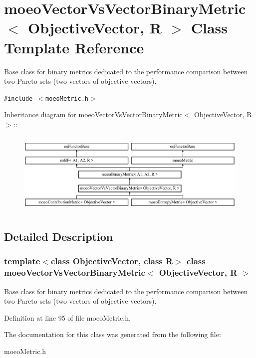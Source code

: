 \section{moeo\-Vector\-Vs\-Vector\-Binary\-Metric$<$ Objective\-Vector, R $>$ Class Template Reference}
\label{classmoeoVectorVsVectorBinaryMetric}
Base class for binary metrics dedicated to the performance comparison between two Pareto sets (two vectors of objective vectors).  


{\tt \#include $<$moeo\-Metric.h$>$}

Inheritance diagram for moeo\-Vector\-Vs\-Vector\-Binary\-Metric$<$ Objective\-Vector, R $>$::\begin{figure}[H]
\begin{center}
\leavevmode
\includegraphics[height=4.03458cm]{classmoeoVectorVsVectorBinaryMetric}
\end{center}
\end{figure}


\subsection{Detailed Description}
\subsubsection*{template$<$class Objective\-Vector, class R$>$ class moeo\-Vector\-Vs\-Vector\-Binary\-Metric$<$ Objective\-Vector, R $>$}

Base class for binary metrics dedicated to the performance comparison between two Pareto sets (two vectors of objective vectors). 



Definition at line 95 of file moeo\-Metric.h.

The documentation for this class was generated from the following file:\begin{CompactItemize}
\item 
moeo\-Metric.h\end{CompactItemize}
